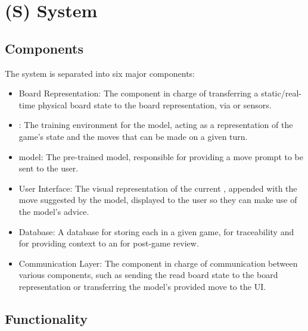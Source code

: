 \documentclass{article}
\begin{document}
    
    
\newpage{}




\section*{(S) System}\label{sec:srs-system}
\renewcommand{\thesubsection}{S.\arabic{subsection}}
\setcounter{subsection}{0}

\subsection{Components}\label{subsec:components}
The system is separated into six major components:

\begin{itemize}
    \item Board Representation: The component
    in charge of transferring a static/real-time physical board state to the board
    representation, via \CV{} or sensors.

    \item \GameState{} \DigitalTwin{}: The training
    environment for the model, acting as a representation of the game's state and the
    moves that can be made on a given turn.

    \item \AI{} model: The pre-trained model,
    responsible for providing a move prompt to be sent to the user.

    \item User Interface: The visual
    representation of the current \GameState{}, appended with the move suggested by
    the model, displayed to the user so they can make use of the model's advice.

    \item \GameState{} Database: A database for
    storing each \GameState{} in a given game, for traceability and for providing
    context to an \LLM{} for post-game review.

    \item Communication Layer: The component
    in charge of communication between various components, such as sending the read
    board state to the board representation or transferring the model’s provided
    move to the UI\@.
\end{itemize}


\subsection{Functionality}\label{subsec:functionality}
\end{document}
